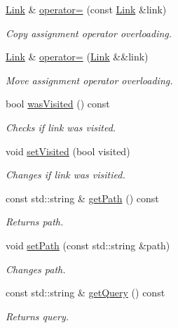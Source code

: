 \begin{DoxyCompactItemize}
\hyperlink{class_crawler_1_1_link}{Link} \& \hyperlink{class_crawler_1_1_link_a94698caeabaa55b0b4b16ea733792203}{operator=} (const \hyperlink{class_crawler_1_1_link}{Link} \&link)
\begin{DoxyCompactList}\small\item\em Copy assignment operator overloading. \end{DoxyCompactList}\item 
\hyperlink{class_crawler_1_1_link}{Link} \& \hyperlink{class_crawler_1_1_link_a0e4f956e93dda3deff3641c3d3188803}{operator=} (\hyperlink{class_crawler_1_1_link}{Link} \&\&link)
\begin{DoxyCompactList}\small\item\em Move assignment operator overloading. \end{DoxyCompactList}\item 
bool \hyperlink{class_crawler_1_1_link_a238ee637d3eaafa958f026babea76c17}{was\+Visited} () const 
\begin{DoxyCompactList}\small\item\em Checks if link was visited. \end{DoxyCompactList}\item 
void \hyperlink{class_crawler_1_1_link_a39ed70d40b4b5364a6510f32214fb9d0}{set\+Visited} (bool visited)
\begin{DoxyCompactList}\small\item\em Changes if link was visitied. \end{DoxyCompactList}\item 
const std\+::string \& \hyperlink{class_crawler_1_1_link_ad7bf54537b1230e37dd00c75273c901d}{get\+Path} () const 
\begin{DoxyCompactList}\small\item\em Returns path. \end{DoxyCompactList}\item 
void \hyperlink{class_crawler_1_1_link_a6fe245b48b238800ba4b41e97fed92e5}{set\+Path} (const std\+::string \&path)
\begin{DoxyCompactList}\small\item\em Changes path. \end{DoxyCompactList}\item 
const std\+::string \& \hyperlink{class_crawler_1_1_link_a1ff66f8100180d6c39681ff459c3d44c}{get\+Query} () const 
\begin{DoxyCompactList}\small\item\em Returns query. \end{DoxyCompactList}\item 

\end{DoxyCompactItemize}
